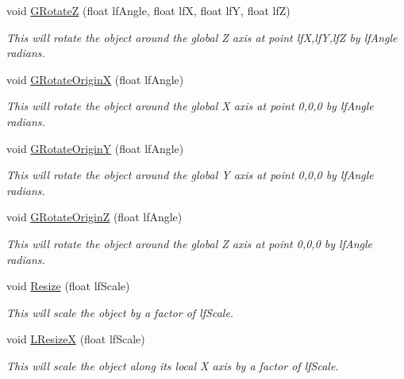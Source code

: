\begin{DoxyCompactItemize}
void \hyperlink{classc_matrix4_a5b357f5686b74e0feeff7eaae070f566}{GRotateZ} (float lfAngle, float lfX, float lfY, float lfZ)
\begin{DoxyCompactList}\small\item\em This will rotate the object around the global Z axis at point lfX,lfY,lfZ by lfAngle radians. \item\end{DoxyCompactList}\item 
void \hyperlink{classc_matrix4_a3ddcb503ea46911e194a9b881a6f0bee}{GRotateOriginX} (float lfAngle)
\begin{DoxyCompactList}\small\item\em This will rotate the object around the global X axis at point 0,0,0 by lfAngle radians. \item\end{DoxyCompactList}\item 
void \hyperlink{classc_matrix4_abe68a204b91201b33adc32f5b354631e}{GRotateOriginY} (float lfAngle)
\begin{DoxyCompactList}\small\item\em This will rotate the object around the global Y axis at point 0,0,0 by lfAngle radians. \item\end{DoxyCompactList}\item 
void \hyperlink{classc_matrix4_af5ecfcfab719acf23ddb1148ad24825a}{GRotateOriginZ} (float lfAngle)
\begin{DoxyCompactList}\small\item\em This will rotate the object around the global Z axis at point 0,0,0 by lfAngle radians. \item\end{DoxyCompactList}\item 
void \hyperlink{classc_matrix4_a4785b8464f65d9784db634f3a6f34e52}{Resize} (float lfScale)
\begin{DoxyCompactList}\small\item\em This will scale the object by a factor of lfScale. \item\end{DoxyCompactList}\item 
void \hyperlink{classc_matrix4_af87d56540f23692fd69d0b245ad404e6}{LResizeX} (float lfScale)
\begin{DoxyCompactList}\small\item\em This will scale the object along its local X axis by a factor of lfScale. \item\end{DoxyCompactList}\item 

\end{DoxyCompactItemize}
